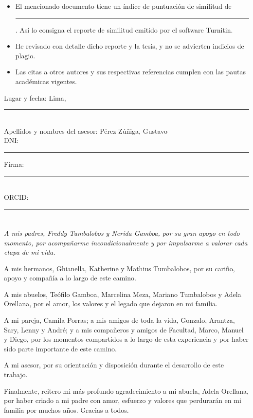 \documentclass[12pt,a4paper,oneside]{report}
\numberwithin{figure}{chapter}
\numberwithin{table}{chapter}
\numberwithin{equation}{chapter}
\DeclareRobustCommand{\%}{\ifmmode\text{\char37\relax}\else\char37\relax\fi}%
\begin{document}
\begin{itemize}
\item El mencionado documento tiene un índice de puntuación de similitud de \rule{1.2cm}{0.4pt}\%. Así lo
consigna el reporte de similitud emitido por el software Turnitin.
\item He revisado con detalle dicho reporte y la tesis, y no se advierten indicios de plagio.
\item Las citas a otros autores y sus respectivas referencias cumplen con las pautas académicas vigentes.
\end{itemize}

\vspace{0.8cm}
\noindent Lugar y fecha: Lima, \rule{4cm}{0.4pt}\\[0.6cm]
\noindent Apellidos y nombres del asesor: Pérez Zúñiga, Gustavo\\[0.4cm]
\noindent DNI: \rule{3cm}{0.4pt} \hfill Firma: \rule{4cm}{0.4pt}\\[0.4cm]
\noindent ORCID: \rule{5cm}{0.4pt}

\chapter*{}
\thispagestyle{plain}
\vspace*{0cm}
\begin{flushright}
\begin{minipage}{0.62\linewidth}
\itshape
A mis padres, Freddy Tumbalobos y Nerida Gamboa, por su gran apoyo en todo momento, por acompañarme incondicionalmente y por impulsarme a valorar cada etapa de mi vida.

A mis hermanos, Ghianella, Katherine y Mathius Tumbalobos, por su cariño, apoyo y compañía a lo largo de este camino.

A mis abuelos, Teófilo Gamboa, Marcelina Meza, Mariano Tumbalobos y Adela Orellana, por el amor, los valores y el legado que dejaron en mi familia.

A mi pareja, Camila Porras; a mis amigos de toda la vida, Gonzalo, Arantza, Sary, Lenny y André; y a mis compañeros y amigos de Facultad, Marco, Manuel y Diego, por los momentos compartidos a lo largo de esta experiencia y por haber sido parte importante de este camino.

A mi asesor, por su orientación y disposición durante el desarrollo de este trabajo.

Finalmente, reitero mi más profundo agradecimiento a mi abuela, Adela Orellana, por haber criado a mi padre con amor, esfuerzo y valores que perdurarán en mi familia por muchos años. Gracias a todos.
\end{minipage}
\end{flushright}
\end{document}
